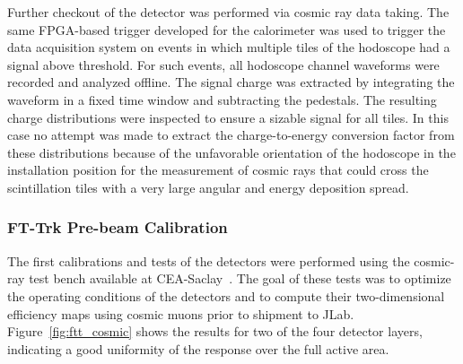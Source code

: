 Further checkout of the detector was performed via cosmic ray data taking. The same FPGA-based trigger developed
for the calorimeter was used to trigger the data acquisition system on events in which multiple tiles of the hodoscope
had a signal above threshold. For such events, all hodoscope channel waveforms were recorded and analyzed offline.
The signal charge was extracted by integrating the waveform in a fixed time window and subtracting the pedestals. The
resulting charge distributions were inspected to ensure a sizable signal for all tiles. In this case no attempt was made to
extract the charge-to-energy conversion factor from these distributions because of the unfavorable orientation of
the hodoscope in the installation position for the measurement of cosmic rays that could cross the scintillation tiles with
a very large angular and energy deposition spread.

\subsubsection{FT-Trk Pre-beam Calibration}

The first calibrations and tests of the detectors were performed using the cosmic-ray test bench available at
CEA-Saclay~\cite{mm}. The goal of these tests was to optimize the operating conditions of the detectors and to
compute their two-dimensional efficiency maps using cosmic muons prior to shipment to JLab.
Figure~\ref{fig:ftt_cosmic} shows the results for two of the four detector layers, indicating a good uniformity of
the response over the full active area. 

